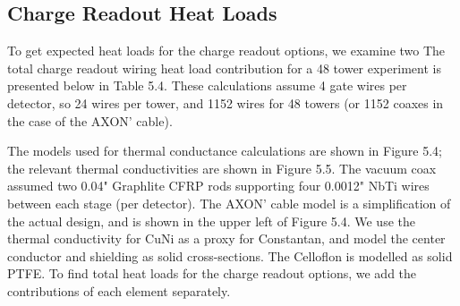 \documentclass{report}
\begin{document}
\subsection{Charge Readout Heat Loads}

To get expected heat loads for the charge readout options, we examine two
The total charge readout wiring heat load contribution for a 48 tower experiment is presented below in Table 5.4. These calculations assume 4 gate wires per detector, so 24 wires per tower, and 1152 wires for 48 towers (or 1152 coaxes in the case of the AXON' cable).

The models used for thermal conductance calculations are shown in Figure 5.4; the relevant thermal conductivities are shown in Figure 5.5. The vacuum coax assumed two 0.04" Graphlite CFRP rods supporting four 0.0012" NbTi wires between each stage (per detector). The AXON' cable model is a simplification of the actual design, and is shown in the upper left of Figure 5.4. We use the thermal conductivity for CuNi as a proxy for Constantan, and model the center conductor and shielding as solid cross-sections. The Celloflon is modelled as solid PTFE. To find total heat loads for the charge readout options, we add the contributions of each element separately.
\end{document}
